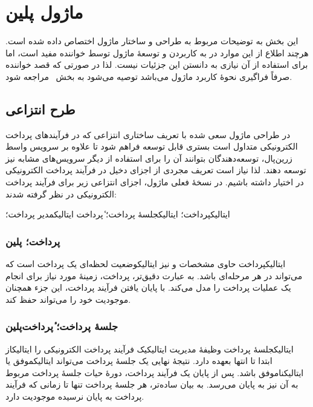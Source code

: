 \section{ماژول ‌پلین{}}
\label{بخش:ماژول}

این بخش به توضیحات مربوط به طراحی و ساختار
ماژول  اختصاص داده شده است. هرچند اطلاع
از این موارد در به کاربردن و توسعهٔ ماژول توسط
خواننده مفید است، اما برای استفاده از آن نیازی به
دانستن این جزئیات نیست. لذا در صورتی که قصد
خواننده صرفاً فراگیری نحوهٔ کاربرد ماژول می‌باشد
توصیه می‌شود به بخش~ مراجعه شود.

\subsection{طرح انتزاعی}
در طراحی ماژول سعی شده با تعریف ساختاری انتزاعی
که در فرآیندهای پرداخت الکترونیکی متداول است
بستری قابل توسعه فراهم شود تا علاوه بر سرویس واسط
زرین‌پال، توسعه‌دهندگان بتوانند آن را برای 
استفاده از دیگر سرویس‌های مشابه نیز توسعه دهند.
لذا نیاز است تعریف مجردی از اجزای دخیل در
فرآیند پرداخت الکترونیکی در اختیار داشته باشیم.
در نسخهٔ فعلی ماژول، اجزای انتزاعی زیر برای فرآیند 
پرداخت الکترونیکی در نظر گرفته شدند:
\begin{itemize}
	 ‌ایتالیک{پرداخت}؛ 
	 ‌ایتالیک{جلسهٔ پرداخت}؛ ٔ‌پرداخت{}
	 ‌ایتالیک{مدیر پرداخت}؛ 
\end{itemize}


\subsubsection{پرداخت؛ ‌پلین{}}
‌ایتالیک{پرداخت} حاوی مشخصات و نیز
‌ایتالیک{وضعیت لحظه‌ای} یک پرداخت
است که می‌تواند در هر مرحله‌ای باشد.
به عبارت دقیق‌تر، پرداخت، زمینهٔ
مورد نیاز برای انجام یک عملیات پرداخت
را مدل می‌کند. با پایان یافتن فرآیند پرداخت،
این جزء همچنان موجودیت خود را می‌تواند حفظ کند. 

\subsubsection{جلسهٔ پرداخت؛ ٔ‌پرداخت‌پلین{}}
‌ایتالیک{جلسهٔ پرداخت} وظیفهٔ مدیریت
‌ایتالیک{یک} فرآیند پرداخت الکترونیکی را
‌ایتالیک{از ابتدا تا انتها} بعهده دارد.
نتیجهٔ نهایی یک جلسهٔ پرداخت می‌تواند
‌ایتالیک{موفق} یا ‌ایتالیک{ناموفق} باشد. 
پس از پایان یک فرآیند پرداخت، دورهٔ حیات
جلسهٔ پرداخت مربوط به آن نیز به پایان می‌رسد.
به بیان ساده‌تر، هر جلسهٔ پرداخت تنها تا زمانی
که فرآیند پرداخت به پایان نرسیده موجودیت دارد.


